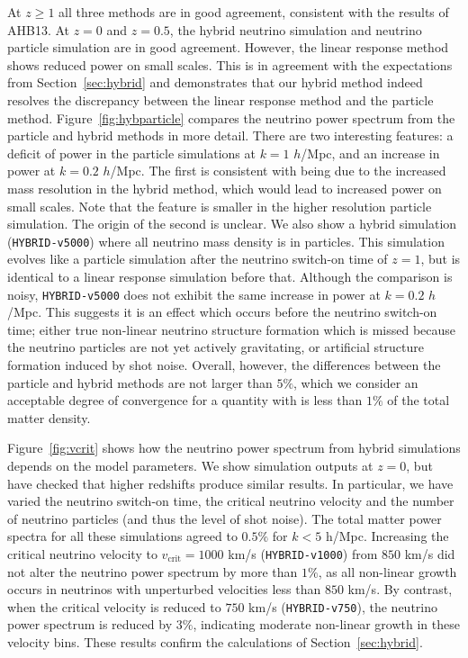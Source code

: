\documentclass[useAMS, usenatbib]{mnras}
\begin{document}

At $z \geq 1$ all three methods are in good agreement, consistent with the results of AHB13. At $z = 0$ and $z=0.5$, the hybrid neutrino simulation and neutrino particle simulation are in good agreement. However, the linear response method shows reduced power on small scales. This is in agreement with the expectations from Section~\ref{sec:hybrid} and demonstrates that our hybrid method indeed resolves the discrepancy between the linear response method and the particle method. Figure~\ref{fig:hybparticle} compares the neutrino power spectrum from the particle and hybrid methods in more detail. There are two interesting features: a deficit of power in the particle simulations at $k=1$ $h$/Mpc, and an increase in power at $k=0.2$ $h$/Mpc. The first is consistent with being due to the increased mass resolution in the hybrid method, which would lead to increased power on small scales. Note that the feature is smaller in the higher resolution particle simulation. The origin of the second is unclear. We also show a hybrid simulation (\texttt{HYBRID-v5000}) where all neutrino mass density is in particles. This simulation evolves like a particle simulation after the neutrino switch-on time of $z=1$, but is identical to a linear response simulation before that. Although the comparison is noisy, \texttt{HYBRID-v5000} does not exhibit the same increase in power at $k=0.2$ $h$/Mpc. This suggests it is an effect which occurs before the neutrino switch-on time; either true non-linear neutrino structure formation which is missed because the neutrino particles are not yet actively gravitating, or artificial structure formation induced by shot noise. Overall, however, the differences between the particle and hybrid methods are not larger than $5\%$, which we consider an acceptable degree of convergence for a quantity with is less than $1\%$ of the total matter density.

Figure~\ref{fig:vcrit} shows how the neutrino power spectrum from hybrid simulations depends on the model parameters. We show simulation outputs at $z=0$, but have checked that higher redshifts produce similar results. In particular, we have varied the neutrino switch-on time, the critical neutrino velocity and the number of neutrino particles (and thus the level of shot noise). The total matter power spectra for all these simulations agreed to $0.5\%$ for $k < 5$ h/Mpc. Increasing the critical neutrino velocity to $v_\mathrm{crit} = 1000$ km/s (\texttt{HYBRID-v1000}) from $850$ km/s did not alter the neutrino power spectrum by more than $1\%$, as all non-linear growth occurs in neutrinos with unperturbed velocities less than $850$ km/s. By contrast, when the critical velocity is reduced to $750$ km/s (\texttt{HYBRID-v750}), the neutrino power spectrum is reduced by $3\%$, indicating moderate non-linear growth in these velocity bins. These results confirm the calculations of Section~\ref{sec:hybrid}.
\end{document}
